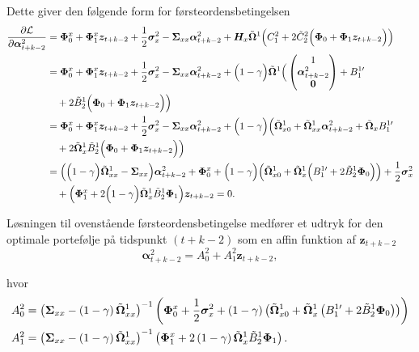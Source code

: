 \documentclass[
  a4paper,
  oneside]{memoir}
\begin{document}
Dette giver den følgende form for førsteordensbetingelsen
\begin{align*}
\frac{\partial \mathcal{L}}{\partial\bm{\alpha}_{t+k-2}^2 }&= \bm{\Phi}_0^x+\bm{\Phi}_1^x\bm{z}_{t+k-2}+\frac{1}{2} \bm{\sigma}_x^2 -\bm{\Sigma}_{xx}\bm{\alpha}_{t+k-2}^2 +\bm{H}_x\Tilde{\bm{\Omega}}^{1}\Big(C_1^2+ 2\Tilde{C}_2^2 \Big(\bm{\Phi}_0+\bm{\Phi}_1\bm{z}_{t+k-2}\Big)\Big)\\
&=\bm{\Phi}_0^x+\bm{\Phi}_1^x\bm{z}_{t+k-2}+\frac{1}{2} \bm{\sigma}_x^2 -\bm{\Sigma}_{xx}\bm{\alpha}_{t+k-2}^2 + \Big(1-\gamma\Big)\Tilde{\bm{\Omega}}^{1} \Big(\begin{pmatrix} 1\\ \bm{\alpha}_{t+k-2}^2 \\ \bm{0} \end{pmatrix} + B_1^{1\prime}\\
&\quad + 2\Tilde{B}_2^1 \Big(\bm{\Phi}_0+\bm{\Phi}_1\bm{z}_{t+k-2}\Big)\Big)\\
&=\bm{\Phi}_0^x+\bm{\Phi}_1^x\bm{z}_{t+k-2}+\frac{1}{2} \bm{\sigma}_x^2 -\bm{\Sigma}_{xx}\bm{\alpha}_{t+k-2}^2 + \Big(1-\gamma\Big)\Big(\Tilde{\bm{\Omega}}_{x0}^{1} + \Tilde{\bm{\Omega}}_{xx}^{1} \bm{\alpha}_{t+k-2}^2 + \Tilde{\bm{\Omega}}_{x} B_1^{1\prime}\\
&\quad + 2\Tilde{\bm{\Omega}}_{x}^1 \Tilde{B}_2^1 \Big(\bm{\Phi}_0+\bm{\Phi}_1\bm{z}_{t+k-2}\Big)\Big)\\
&=\Big(\Big(1-\gamma\Big)\Tilde{\bm{\Omega}}_{xx}^{1} - \bm{\Sigma}_{xx} \Big)  \bm{\alpha}_{t+k-2}^2 + \bm{\Phi}_0^x + \Big(1-\gamma\Big)\Big(\Tilde{\bm{\Omega}}_{x0}^{1} + \Tilde{\bm{\Omega}}_{x}^{1}\Big(B_1^{1\prime} + 2\Tilde{B}_2^{1}\bm{\Phi}_0\Big)\Big)+ \frac{1}{2} \bm{\sigma}_x^2\\
&\quad + \Big(\bm{\Phi}_1^x + 2\Big(1-\gamma\Big)\Tilde{\bm{\Omega}}_{x}^{1} \Tilde{B}_2^1\bm{\Phi}_1 \Big)\bm{z}_{t+k-2}=0.
\end{align*}

Løsningen til ovenstående førsteordensbetingelse medfører et udtryk for den optimale portefølje på tidspunkt \((t+k-2)\) som en affin funktion af \(\bm{z}_{t+k-2}\)
\[\bm{\alpha}_{t+k-2}^2 = A_0^2 + A_1^2 \bm{z}_{t+k-2},\]

hvor
\begin{align*}
A_0^2&=\left(\bm{\Sigma}_{xx} - \left(1-\gamma\right)\Tilde{\bm{\Omega}}_{xx}^1\right)^{-1} \left(\bm{\Phi}_0^x + \frac{1}{2} \bm{\sigma}_x^2 + \left(1-\gamma\right) \left(\Tilde{\bm{\Omega}}_{x0}^1 + \Tilde{\bm{\Omega}}_{x}^1 \left(B_1^{1\prime} + 2\Tilde{B}_2^{1}\bm{\Phi}_0\right)\right)\right)\\
A_1^2&=\left(\bm{\Sigma}_{xx} - \left(1-\gamma\right)\Tilde{\bm{\Omega}}_{xx}^1\right)^{-1}\left(\bm{\Phi}_1^x+2\left(1-\gamma\right) \Tilde{\bm{\Omega}}_{x}^1 \Tilde{B} _2^{1}\bm{\Phi}_1\right).
\end{align*}
\end{document}
